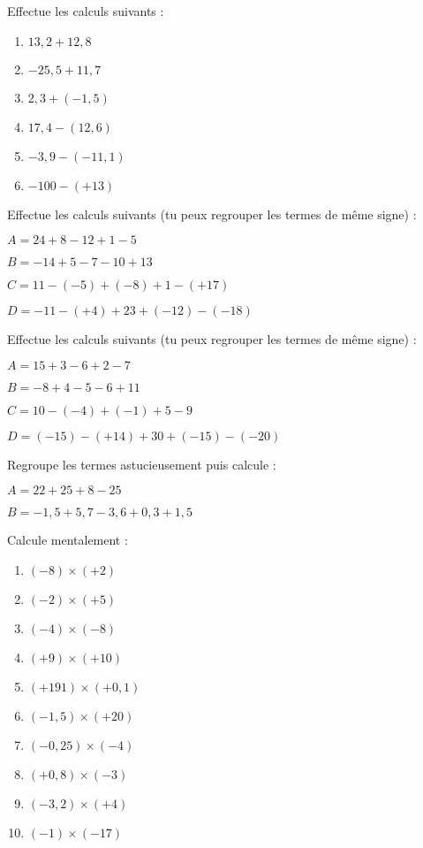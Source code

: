 \begin{exercice}Effectue les calculs suivants :
\begin{enumerate}
\item $13,2 +12,8$
\item $-25,5 +11,7$
\item $2,3 +(-1,5)$
\item $17,4 - (12,6)$
\item $-3,9 - (-11,1)$
\item $-100 - (+13)$
\end{enumerate}
\end{exercice}



\begin{exercice}Effectue les calculs suivants (tu peux  regrouper les termes de même signe) :

$A = 24 +8 -12 +1 -5$

$B = -14 +5 -7 -10 +13$

$C = 11 -(-5) +(-8) +1 -(+17)$

$D = -11 -(+4) +23 +(-12) -(-18)$
\end{exercice}



\begin{exercice}Effectue les calculs suivants (tu peux  regrouper les termes de même signe) :

$A = 15 +3 -6 +2 -7 $

$B = -8 +4 -5 -6 +11$

$C = 10 -(-4) +(-1) +5 -9$

$D = (-15) -(+14) +30 +(-15) -(-20)$
\end{exercice}


\begin{exercice}Regroupe les termes astucieusement puis calcule :

$A = 22 +25 +8 -25$

$B = -1,5 +5,7 -3,6 +0,3 +1,5$
\end{exercice} 






\begin{exercice}Calcule mentalement :
\begin{enumerate} 
\item $(-8) \times (+2)$
\item $(-2) \times (+5)$
\item $(-4) \times (-8)$
\item $(+9) \times (+10)$
\item $(+191) \times (+0,1)$ 
\item $(-1,5) \times (+20)$
\item $(-0,25) \times (-4)$
\item $(+0,8) \times (-3)$
\item $(-3,2) \times (+4)$
\item $(-1) \times (-17)$
\end{enumerate}
\end{exercice}



